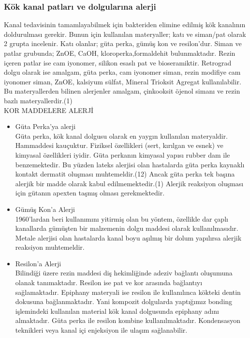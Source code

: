 \subsubsection{Kök kanal patları ve dolgularına alerji}
Kanal tedavisinin tamamlayabilmek için bakteriden elimine edilmiş kök kanalının doldurulması gerekir.  Bunun için kullanılan materyaller; katı ve siman/pat olarak 2 grupta incelenir. Katı olanlar; güta perka, gümüş kon ve resilon’dur. Siman ve patlar grubunda; ZnOE, CaOH, kloroperka,formaldehit bulunmaktadır. Rezin içeren patlar ise cam iyonomer, silikon esaslı pat ve bioseramiktir. 
Retrograd dolgu olarak ise amalgam, güta perka, cam iyonomer siman, rezin modifiye cam iyonomer siman, ZnOE, kalsiyum sülfat, Mineral Trioksit Agregat kullanılabilir. Bu materyallerden bilinen alerjenler amalgam, çinkooksit öjenol simanı ve rezin bazlı materyallerdir.(1)\\

KOR MADDELERE ALERJİ

\begin{itemize}
   \item Güta Perka'ya alerji\\
   Güta perka, kök kanal dolgusu olarak en yaygın kullanılan materyaldir. Hammaddesi kauçuktur. Fiziksel özellikleri (sert, kırılgan ve esnek) ve kimyasal özellikleri iyidir. Güta perkanın kimyasal yapısı rubber dam ile benzemektedir. Bu yüzden lateks alerjisi olan hastalarda güta perka kaynaklı kontakt dermatit oluşması muhtemeldir.(12)  Ancak güta perka tek başına alerjik bir madde olarak kabul edilmemektedir.(1)  Alerjik reaksiyon oluşması için gütanın apexten taşmış olması gerekmektedir.
   
   \item Gümüş Kon'a Alerji\\
   1960’lardan beri kullanımını yitirmiş olan bu yöntem, özellikle dar çaplı kanallarda gümüşten bir malzemenin dolgu maddesi olarak kullanılmasıdır. Metale alerjisi olan hastalarda kanal boyu aşılmış bir dolum yapılırsa alerjik reaksiyon muhtemeldir.
   
   \item Resilon'a Alerji\\
   Bilindiği üzere rezin maddesi diş hekimliğinde adeziv bağlantı oluşumuna olanak tanımaktadır. Resilon ise pat ve kor arasında bağlantıyı sağlamaktadır. Epiphany materyali ise resilon ile kullanılınca kökteki dentin dokusuna bağlanmaktadır.  Yani kompozit dolgularda yaptığımız bonding işlemindeki kullanılan material kök kanal dolgusunda epiphany adını almaktadır. Güta perka ile resilon kombine kullanılmaktadır. Kondensasyon teknikleri veya kanal içi enjeksiyon ile ulaşım sağlanabilir. 
 
\end{itemize}

